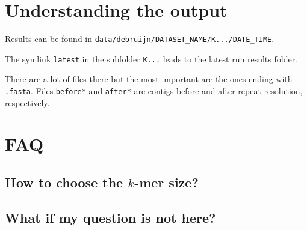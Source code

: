 \documentclass{article}
\begin{document}
\section{Understanding the output}
Results can be found in {\tt data/debruijn/DATASET\_NAME/K.../DATE\_TIME}.

The symlink {\tt latest} in the subfolder {\tt K...} leads to the latest run results folder.

There are a lot of files there but the most important are the ones ending with {\tt .fasta}. Files {\tt before*} and {\tt after*} are contigs before 
and after repeat resolution, respectively.

\section{FAQ}
\subsection{How to choose the $k$-mer size?}
\subsection{What if my question is not here?}
\end{document}
